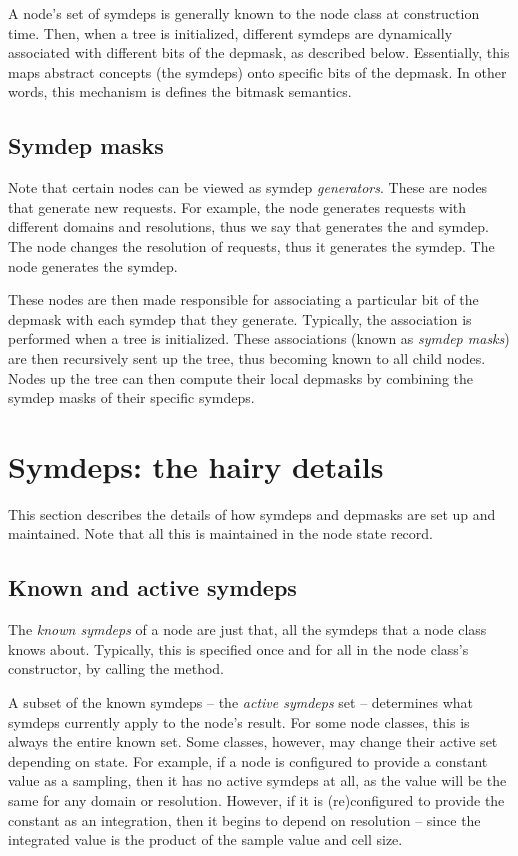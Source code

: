   A node's set of symdeps is generally known to the node class at construction
  time. Then, when a tree is initialized, different symdeps are dynamically
  associated with different bits of the depmask, as described below.
  Essentially, this maps abstract concepts (the symdeps) onto specific bits of
  the depmask. In other words, this mechanism is defines the bitmask semantics.

\subsection{Symdep masks}

  Note that certain nodes can be viewed as symdep {\em generators}. These are
  nodes that generate new requests. For example, the  node generates
  requests with different domains and resolutions, thus we say that 
  generates the  and  symdep. The 
  node changes the resolution of requests, thus it generates the
   symdep. The  node generates the
   symdep.

  These nodes are then made responsible for associating a particular bit of the
  depmask with each symdep that they generate. Typically, the association is
  performed when a tree is initialized. These associations (known as {\em
  symdep masks}) are then recursively sent up the tree, thus becoming known to
  all child nodes. Nodes up the tree can then compute their local depmasks by
  combining the symdep masks of their specific symdeps.

\section{Symdeps: the hairy details}

  This section describes the details of how symdeps and depmasks are set up and
  maintained. Note that all this is maintained in the node state record.

\subsection{Known and active symdeps} 
  
  The {\em known symdeps} of a node are just that, all the symdeps that a node
  class knows about. Typically, this is specified once and for all in the node
  class's constructor, by calling the  method. 

  A subset of the known symdeps -- the {\em active symdeps} set -- determines
  what symdeps currently apply to the node's result. For some node classes,
  this is always the entire known set. Some classes, however, may change their
  active set depending on state. For example, if a  node is
  configured to provide a constant value as a sampling, then it has no active
  symdeps at all, as the value will be the same for any domain or resolution.
  However, if it is (re)configured to provide the constant as an integration,
  then it begins to depend on resolution -- since the integrated value is the
  product of the sample value and cell size.

